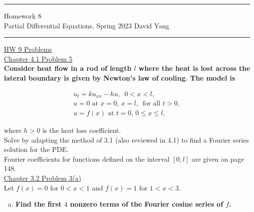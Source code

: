 \documentclass[11pt]{article}
\begin{document}
	\hrule
	\begin{center}
		{\Large Homework 8} \\ %
		\vspace{0.2cm}
		Partial Differential Equations, Spring 2023 \hfill David Yang %
	\end{center}

\hrule

\vspace{1em}


\underline{HW 9 Problems} \\

\underline{Chapter 4.1 Problem 5} \\

\textbf{Consider heat flow in a rod of length $l$ where the heat is lost across the lateral boundary is given by Newton's law of cooling. The model is} 

\[
\begin{array}{c}
    u_t = ku_{xx} - hu, \,\,\, 0 < x < l, \\
    u = 0 \text{ at } x =0, \, x=l, \, \text{ for all } t > 0,\\
    u = f(x) \text { at } t=0, \, 0 \leq x \leq l,
\end{array}
\]

where $h > 0$ is the heat loss coefficient. \\

Solve by adapting the method of 3.1 (also reviewed in 4.1) to find a Fourier series solution for the PDE. \\

Fourier coefficients for functions defined on the interval $[0, l]$ are given on page 148. \\

\underline{Chapter 3.2 Problem 3(a)} \\

Let $f(x)=0$ for $0<x<1$ and $f(x)=1$ for $1<x<3$. 
\begin{enumerate}[a)] 
    \item \textbf{Find the first $4$ nonzero terms of the Fourier cosine series of $f$.}
  
\end{enumerate}
\end{document}
